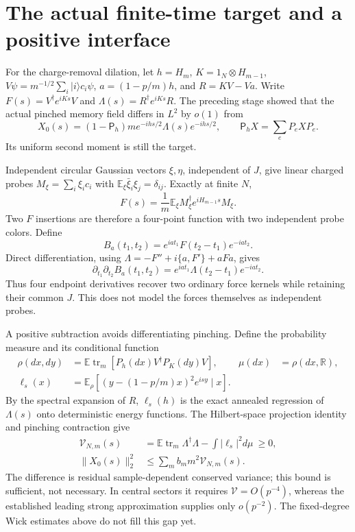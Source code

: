 \documentclass[11pt,a4paper]{article}
\newcommand{\EE}{\mathbb E}
\newcommand{\tr}{\operatorname{tr}}
\begin{document}
\newpage
\section{The actual finite-time target and a positive interface}
For the charge-removal dilation, let $h=H_m$, $K=1_N\otimes H_{m-1}$,
$V\psi=m^{-1/2}\sum_i|i\rangle c_i\psi$, $a=(1-p/m)h$, and
$R=KV-Va$. Write $F(s)=V^\dagger e^{iKs}V$ and
$\Lambda(s)=R^\dagger e^{iKs}R$.
The preceding stage showed that the actual pinched memory field
differs in $L^2$ by $o(1)$ from
\begin{equation}
 X_0(s)=(1-\mathsf P_h)m e^{-ihs/2}\Lambda(s)e^{-ihs/2},
 \qquad \mathsf P_hX=\sum_eP_eXP_e.
\end{equation}
Its uniform second moment is still the target.

Independent circular Gaussian vectors $\xi,\eta$, independent of
$J$, give linear charged probes $M_\xi=\sum_i\xi_i c_i$ with
$\EE_\xi\bar\xi_i\xi_j=\delta_{ij}$. Exactly at finite $N$,
\begin{equation}
 F(s)=\frac1m\EE_\xi M_\xi^\dagger e^{iH_{m-1}s}M_\xi.
\end{equation}
Two $F$ insertions are therefore a four-point function with two
independent probe colors. Define
\begin{equation}
 B_a(t_1,t_2)=e^{iat_1}F(t_2-t_1)e^{-iat_2}.
\end{equation}
Direct differentiation, using $\Lambda=-F''+i\{a,F'\}+aFa$, gives
\begin{equation}
 \partial_{t_1}\partial_{t_2}B_a(t_1,t_2)
 =e^{iat_1}\Lambda(t_2-t_1)e^{-iat_2}.\label{eq:probe}
\end{equation}
Thus four endpoint derivatives recover two ordinary force kernels
while retaining their common $J$. This does not model the forces
themselves as independent probes.

A positive subtraction avoids differentiating pinching. Define the
probability measure and its conditional function
\begin{align}
 \rho(dx,dy)&=\EE\tr_m[P_h(dx)V^\dagger P_K(dy)V],&
 \mu(dx)&=\rho(dx,\mathbb R),\\
 \ell_s(x)&=\EE_\rho[(y-(1-p/m)x)^2e^{isy}\mid x].
\end{align}
By the spectral expansion of $R$, $\ell_s(h)$ is the exact annealed
regression of $\Lambda(s)$ onto deterministic energy functions.
The Hilbert-space projection identity and pinching contraction give
\begin{align}
 \mathcal V_{N,m}(s)&=\EE\tr_m\Lambda^\dagger\Lambda
                  -\int|\ell_s|^2d\mu\ \ge0,\\
 \|X_0(s)\|_2^2&\le\sum_m b_m m^2\mathcal V_{N,m}(s).\label{eq:target}
\end{align}
The difference is residual sample-dependent conserved variance;
this bound is sufficient, not necessary. In central sectors it
requires $\mathcal V=O(p^{-4})$, whereas the established leading
strong approximation supplies only $o(p^{-2})$.
The fixed-degree Wick estimates above do not fill this gap yet.
\end{document}
